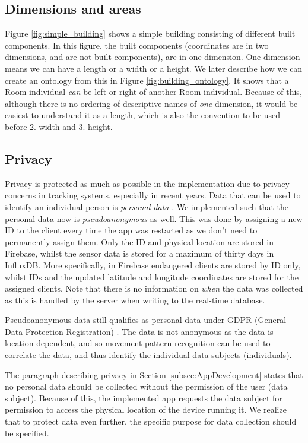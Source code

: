 \documentclass{article}
\begin{document}
\subsection{Dimensions and areas}
Figure \ref{fig:simple_building} shows a simple building consisting of different built components. In this figure, the built components (coordinates are in two dimensions, and are not built components), are in one dimension. One dimension means we can have a length or a width or a height. We later describe how we can create an ontology from this in Figure \ref{fig:building_ontology}. It shows that a Room individual \emph{can} be left or right of another Room individual. Because of this, although there is no ordering of descriptive names of \emph{one} dimension, it would be easiest to understand it as a length, which is also the convention to be used before 2. width and 3. height.
\newpage

\subsection{Privacy}\label{subsec:privacy}
Privacy is protected as much as possible in the implementation due to privacy concerns in tracking systems, especially in recent years. Data that can be used to identify an individual person is \emph{personal data} \cite{noauthor_gdpr_nodate, noauthor_hva_nodate}. We implemented such that the personal data now is \emph{pseudoanonymous} as well. This was done by assigning a new ID to the client every time the app was restarted as we don't need to permanently assign them. Only the ID and physical location are stored in Firebase, whilst the sensor data is stored for a maximum of thirty days in InfluxDB. More specifically, in Firebase endangered clients are stored by ID only, whilst IDs and the updated latitude and longitude coordinates are stored for the assigned clients. Note that there is no information on \emph{when} the data was collected as this is handled by the server when writing to the real-time database.


Pseudoanonymous data still qualifies as personal data under GDPR (General Data Protection Registration) \cite{noauthor_pseudonymous_nodate}. The data is not anonymous as the data is location dependent, and so movement pattern recognition can be used to correlate the data, and thus identify the individual data subjects (individuals).

The paragraph describing privacy in Section \ref{subsec:AppDevelopment} states that no personal data should be collected without the permission of the user (data subject). Because of this, the implemented app requests the data subject for permission to access the physical location of the device running it. We realize that to protect data even further, the specific purpose for data collection should be specified.
\end{document}
